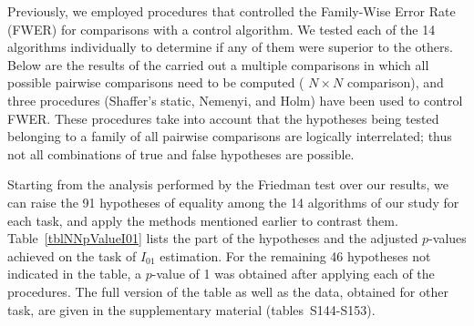 \documentclass[a4paper,fleqn]{cas-sc}
\begin{document}
Previously, we employed procedures that controlled the Family-Wise Error Rate (FWER)
for comparisons with a control algorithm.
We tested each of the 14 algorithms individually to determine if any of them were superior to the others.
Below are the results of the carried out a multiple comparisons in which
all possible pairwise comparisons need to be computed ( $N\times N$ comparison),
and three procedures (Shaffer’s static, Nemenyi, and Holm) have been used to control FWER.
These procedures take into account that the hypotheses being tested belonging
to a family of all pairwise comparisons are logically interrelated;
thus not all combinations of true and false hypotheses are possible.

Starting from the analysis performed by the Friedman test over our results, we can raise the
91 hypotheses of equality among the 14 algorithms of our study for each task,
and apply the methods mentioned earlier to contrast them.
Table~\ref{tblNNpValueI01} lists the part of the hypotheses
and the adjusted $p$-values achieved on the task of $I_{01}$ estimation.
For the remaining 46 hypotheses not indicated in the table,
a $p$-value of 1 was obtained after applying each of the procedures.
The full version of the table as well as the data, obtained for other task,
are given in the supplementary material (tables~S144-S153).
\end{document}
